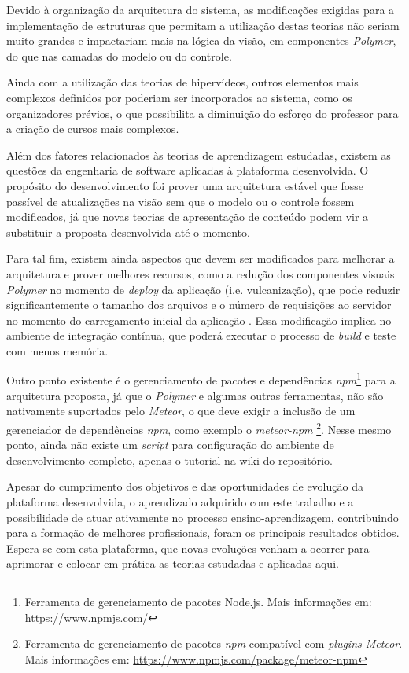 Devido à organização da arquitetura do sistema, as modificações exigidas para a implementação de estruturas que permitam a utilização destas teorias não seriam muito grandes e impactariam mais na lógica da visão, em componentes \textit{Polymer}, do que nas camadas do modelo ou do controle.

Ainda com a utilização das teorias de hipervídeos, outros elementos mais complexos definidos por  poderiam ser incorporados ao sistema, como os organizadores prévios, o que possibilita a diminuição do esforço do professor para a criação de cursos mais complexos.

Além dos fatores relacionados às teorias de aprendizagem estudadas, existem as questões da engenharia de software aplicadas à plataforma desenvolvida. O propósito do desenvolvimento foi prover uma arquitetura estável que fosse passível de atualizações na visão sem que o modelo ou o controle fossem modificados, já que novas teorias de apresentação de conteúdo podem vir a substituir a proposta desenvolvida até o momento.

Para tal fim, existem ainda aspectos que devem ser modificados para melhorar a arquitetura e prover melhores recursos, como a redução dos componentes visuais \textit{Polymer} no momento de \textit{deploy} da aplicação (i.e. vulcanização), que pode reduzir significantemente o tamanho dos arquivos e o número de requisições ao servidor no momento do carregamento inicial da aplicação \cite{vulcanize2013}. Essa modificação implica no ambiente de integração contínua, que poderá executar o processo de \textit{build} e teste com menos memória.

Outro ponto existente é o gerenciamento de pacotes e dependências \textit{npm}\footnote{Ferramenta de gerenciamento de pacotes Node.js. Mais informações em: \url{https://www.npmjs.com/}} para a arquitetura proposta, já que o \textit{Polymer} e algumas outras ferramentas, não são nativamente suportados pelo \textit{Meteor}, o que deve exigir a inclusão de um gerenciador de dependências \textit{npm}, como exemplo o \textit{meteor-npm} \footnote{Ferramenta de gerenciamento de pacotes \textit{npm} compatível com \textit{plugins Meteor}. Mais informações em: \url{https://www.npmjs.com/package/meteor-npm}}. Nesse mesmo ponto, ainda não existe um \textit{script} para configuração do ambiente de desenvolvimento completo, apenas o tutorial na wiki do repositório. 

Apesar do cumprimento dos objetivos e das oportunidades de evolução da plataforma desenvolvida, o aprendizado adquirido com este trabalho e a possibilidade de atuar ativamente no processo ensino-aprendizagem, contribuindo para a formação de melhores profissionais, foram os principais resultados obtidos. Espera-se com esta plataforma, que novas evoluções venham a ocorrer para aprimorar e colocar em prática as teorias estudadas e aplicadas aqui.
